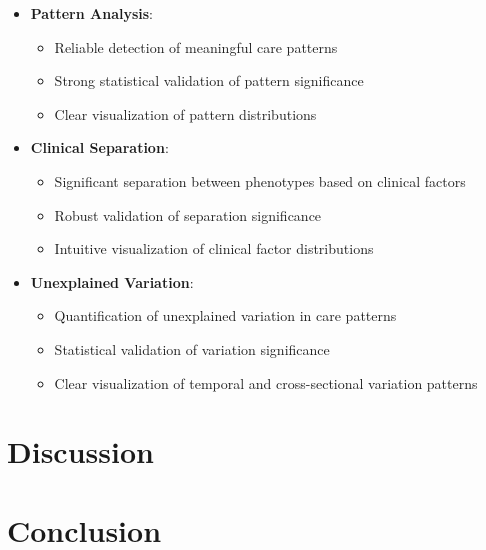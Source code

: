 \documentclass[12pt]{article}
\begin{document}
\begin{itemize}
    \item \textbf{Pattern Analysis}:
    \begin{itemize}
        \item Reliable detection of meaningful care patterns
        \item Strong statistical validation of pattern significance
        \item Clear visualization of pattern distributions
    \end{itemize}
    
    \item \textbf{Clinical Separation}:
    \begin{itemize}
        \item Significant separation between phenotypes based on clinical factors
        \item Robust validation of separation significance
        \item Intuitive visualization of clinical factor distributions
    \end{itemize}
    
    \item \textbf{Unexplained Variation}:
    \begin{itemize}
        \item Quantification of unexplained variation in care patterns
        \item Statistical validation of variation significance
        \item Clear visualization of temporal and cross-sectional variation patterns
    \end{itemize}
\end{itemize}

\section{Discussion}

\section{Conclusion}



\end{document}
